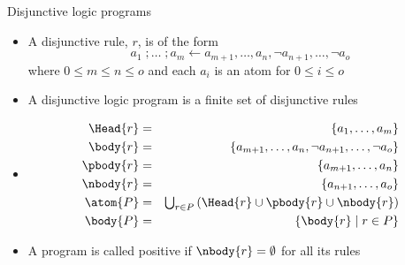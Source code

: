\begin{frame}{Disjunctive logic programs}
  \label{eqn:rule:disjunctive}
  \vspace*{-10pt}
  \begin{itemize}
    \item
          A \alert{disjunctive rule}, $r$, is of the form
          \[
            a_1\;;\dots\;;a_m\leftarrow a_{m+1},\dots,a_n,{\neg a_{n+1}},\dots,{\neg a_o}
          \]
          where $0\leq m\leq n\leq o$ and each $a_i$ is an atom for $0\leq i\leq o$
    \item
          A \alert{disjunctive logic program} is a finite {set} of disjunctive rules
    \item <2->
          \begin{eqnarray*}
            \Head{r}   &=& \{a_1,\dots,a_m\}
            \\
            \body{r}   &=& \{a_{m+1},\dots,a_n, {\neg a_{n+1}},\dots,{\neg a_o}\}
            \\
            \pbody{r}  &=& \{a_{m+1},\dots,a_n\}
            \\
            \nbody{r}  &=& \{a_{n+1},\dots,a_o\}
            \\
            \atom{P} &=& \mbox{$\bigcup$}_{r\in P}\left(\Head{r}\cup\pbody{r}\cup\nbody{r}\right)
            \\
            \body{P} &=& \{\body{r}\mid r\in P\}
          \end{eqnarray*}
    \item<3-> A program is called \alert{positive} if $\nbody{r}=\emptyset$ for all its rules
  \end{itemize}
\end{frame}
